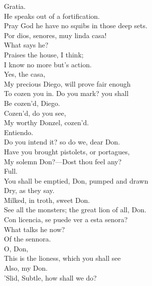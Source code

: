 \documentclass[a4paper,oneside]{memoir}
\begin{document}
\begin{drama*}
\surlyspeaks Gratia.\\
\subtlespeaks {} He speaks out of a fortification.\\
Pray God he have no squibs in those deep sets.\\
\surlyspeaks Por dios, senores, muy linda casa!\\
\subtlespeaks What says he?\\
\facespeaks {} Praises the house, I think;\\
I know no more but's action.\\
\subtlespeaks {} Yes, the casa,\\
My precious Diego, will prove fair enough\\
To cozen you in. Do you mark? you shall\\
Be cozen'd, Diego.\\
\facespeaks {} Cozen'd, do you see,\\
My worthy Donzel, cozen'd.\\
\surlyspeaks {} Entiendo.\\
\subtlespeaks Do you intend it? so do we, dear Don.\\
Have you brought pistolets, or portagues,\\
My solemn Don?---Dost thou feel any?\\
\facespeaks {}  Full.\\
\subtlespeaks You shall be emptied, Don, pumped and drawn\\
Dry, as they say.\\
\facespeaks {} Milked, in troth, sweet Don.\\
\subtlespeaks See all the monsters; the great lion of all, Don.\\
\surlyspeaks Con licencia, se puede ver a esta senora?\\
\subtlespeaks What talks he now?\\
\facespeaks {} Of the sennora.\\
\subtlespeaks {} O, Don,\\
This is the lioness, which you shall see\\
Also, my Don.\\
\facespeaks {} 'Slid, Subtle, how shall we do?\\

\end{drama*}
\end{document}

